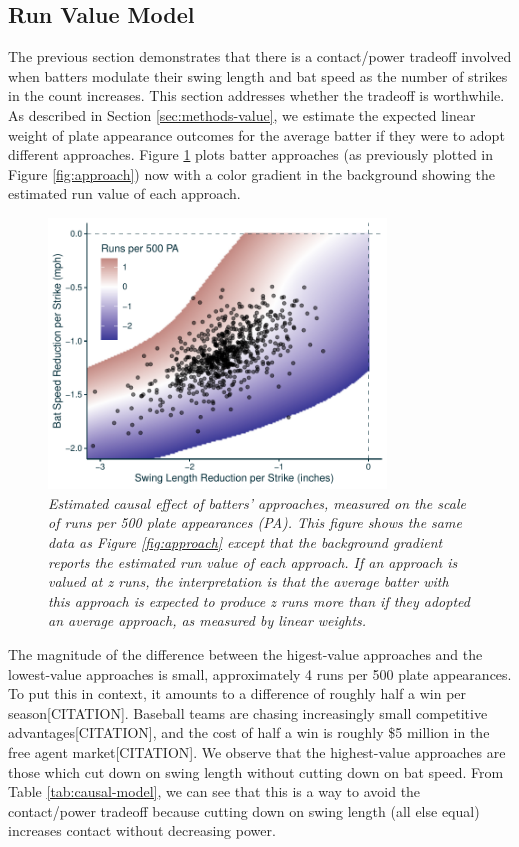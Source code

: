 \documentclass{article}
\begin{document}
    \subsection{Run Value Model}
    \label{sec:results-value}

      The previous section demonstrates that there is a contact/power tradeoff involved when batters modulate their swing length and bat speed as the number of strikes in the count increases. This section addresses whether the tradeoff is worthwhile. As described in Section \ref{sec:methods-value}, we estimate the expected linear weight of plate appearance outcomes for the average batter if they were to adopt different approaches. Figure \ref{fig:approach-run-value} plots batter approaches (as previously plotted in Figure \ref{fig:approach}) now with a color gradient in the background showing the estimated run value of each approach.

      \begin{figure}
        \centering
        \includegraphics[width = 0.8\textwidth]{../../figures/approach_run_value.pdf}
        \caption{\it Estimated causal effect of batters' approaches, measured on the scale of runs per 500 plate appearances (PA). This figure shows the same data as Figure \ref{fig:approach} except that the background gradient reports the estimated run value of each approach. If an approach is valued at z runs, the interpretation is that the average batter with this approach is expected to produce z runs more than if they adopted an average approach, as measured by linear weights.}
        \label{fig:approach-run-value}
      \end{figure}

      The magnitude of the difference between the higest-value approaches and the lowest-value approaches is small, approximately 4 runs per 500 plate appearances. To put this in context, it amounts to a difference of roughly half a win per season[CITATION]. Baseball teams are chasing increasingly small competitive advantages[CITATION], and the cost of half a win is roughly \$5 million in the free agent market[CITATION]. We observe that the highest-value approaches are those which cut down on swing length without cutting down on bat speed. From Table \ref{tab:causal-model}, we can see that this is a way to avoid the contact/power tradeoff because cutting down on swing length (all else equal) increases contact without decreasing power.
\end{document}
